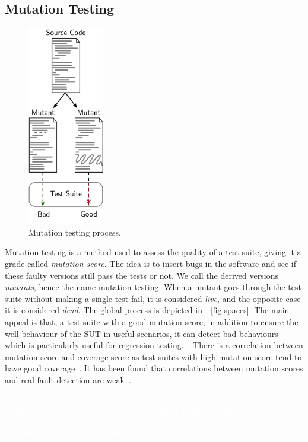 \documentclass[11pt]{sdm_internship}
\newcommand{\addref}[1]{\colorbox{TealBlue!100}{\textcolor{white}{\textbf{$[$\ifx&#1&\ \else#1\fi$]$}}}}
\newcommand{\todo}[1]{\colorbox{Red!75}{\textcolor{white}{\textbf{TODO\ifx&#1&\else: #1\fi}}}}
\newcommand{\rephrase}[1]{\colorbox{BlueViolet!60}{\textcolor{white}{\textbf{$\sim$#1}}}}
\theoremstyle{definition}
\begin{document}
\subsection{Mutation Testing}%
\label{ssec:mutation_testing}
\begin{figure}
  \centering
  \includegraphics[width=9em]{mutation_testing_report}
  \caption{Mutation testing process.}%
\label{fig:mutation_testing}
\end{figure}
Mutation testing is a method used to assess the quality of a test suite, giving it a grade called \textit{mutation score}.
The idea is to insert bugs in the software and see if these faulty versions still pass the tests or not.
We call the derived versions \textit{mutants}, hence the name mutation testing.
When a mutant goes through the test suite without making a single test fail, it is considered \emph{live}, and the opposite case it is considered \emph{dead}.
The global process is depicted in~\figurename~\ref{fig:spaces}.
The main appeal is that, a test suite with a good mutation score, in addition to ensure the well behaviour of the SUT in useful scenarios, it can detect bad behaviours --- which is particularly useful for regression testing.\rephrase{}
There is a correlation between mutation score and coverage score as test suites with high mutation score tend to have good coverage~\cite{assylbekov2013investigating}.
It has been found that correlations between mutation scores and real fault detection are weak~\cite{papadakis2018mutation,just2014mutants}.

\todo{a mutation covered line is stronger than a regular covered line}

\addref{fundational papers}
\end{document}
